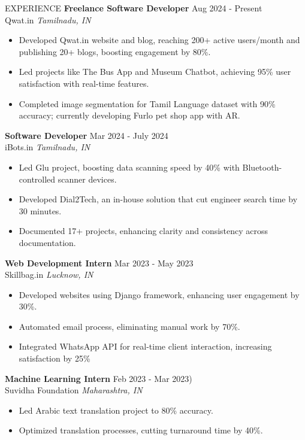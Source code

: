 \documentclass{resume} %
\begin{document}
\begin{rSection}{EXPERIENCE}
\textbf{Freelance Software Developer} \hfill Aug 2024 - Present\\
Qwat.in \hfill \textit{Tamilnadu, IN}
 \begin{itemize}
    \itemsep -3pt {} 
     \item Developed Qwat.in website and blog, reaching 200+ active users/month and publishing 20+ blogs, boosting engagement by 80\%. 
     \item Led projects like The Bus App and Museum Chatbot, achieving 95\% user satisfaction with real-time features. \item Completed image segmentation for Tamil Language dataset with 90\% accuracy; currently developing Furlo pet shop app with AR. 
 
 \end{itemize}
 
\textbf{Software Developer } \hfill Mar 2024 - July 2024\\
iBots.in \hfill \textit{Tamilnadu, IN}
 \begin{itemize}
    \itemsep -3pt {} 
     \item Led Glu project, boosting data scanning speed by 40\% with Bluetooth-controlled scanner devices. 
     \item Developed Dial2Tech, an in-house solution that cut engineer search time by 30 minutes. 
     \item Documented 17+ projects, enhancing clarity and consistency across documentation. 
 \end{itemize}
 
\textbf{Web Development Intern} \hfill Mar 2023 - May 2023\\
Skillbag.in \hfill \textit{Lucknow, IN}
 \begin{itemize}
    \itemsep -3pt {} 
     \item Developed websites using Django framework, enhancing
     user engagement by 30\%.
     \item Automated email process, eliminating manual work by 70\%.
    \item Integrated WhatsApp API for real-time client interaction,
increasing satisfaction by 25\% 
 \end{itemize}

 \textbf{Machine Learning Intern} \hfill Feb 2023 - Mar 2023)\\
Suvidha Foundation \hfill \textit{Maharashtra, IN }
 \begin{itemize}
    \itemsep -3pt {} 
     \item Led Arabic text translation project to 80\% accuracy.
     \item Optimized translation processes, cutting turnaround
time by 40\%.
 \end{itemize}


\end{rSection}
\end{document}
